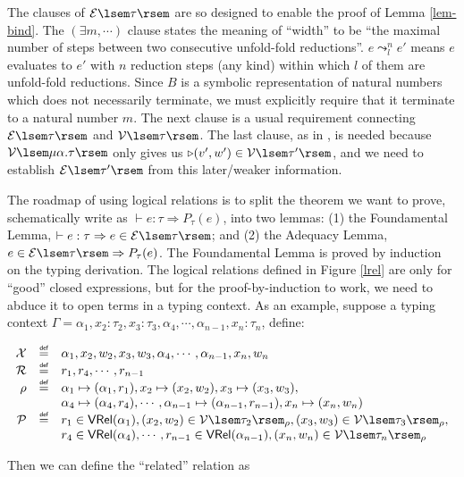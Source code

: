 \documentclass[preprint]{sigplanconf}
\newcommand{\relV}[1]{\mathcal{V}\lsem#1\rsem}
\newcommand{\relE}[1]{\mathcal{E}\lsem#1\rsem}
\newcommand{\later}{\triangleright}
\newcommand\defeq{\mathrel{\overset{\makebox[0pt]{\mbox{\normalfont\tiny\sffamily def}}}{=}}}
\begin{document}
The clauses of $\relE{\tau}$ are so designed to enable the proof of Lemma \ref{lem-bind}. The $(\exists m,\cdots)$ clause states the meaning of ``width'' to be ``the maximal number of steps between two consecutive unfold-fold reductions''. $e\leadsto^n_l e'$ means $e$ evaluates to $e'$ with $n$ reduction steps (any kind) within which $l$ of them are unfold-fold reductions. Since $B$ is a symbolic representation of natural numbers which does not necessarily terminate, we must explicitly require that it terminate to a natural number $m$. The next clause is a usual requirement connecting $\relE{\tau}$ and $\relV{\tau}$. The last clause, as in \cite{dreyer2009logical}, is needed because $\relV{\mu\alpha.\tau}$ only gives us $\later (v',w') \in \relV{\tau'}$, and we need to establish $\relE{\tau'}$ from this later/weaker information.

The roadmap of using logical relations is to split the theorem we want to prove, schematically write as $\vdash e:\tau \Rightarrow P_\tau(e)$, into two lemmas: (1) the Foundamental Lemma, $\vdash e:\tau \Rightarrow e\in\relE{\tau}$; and (2) the Adequacy Lemma, $e\in\relE{\tau} \Rightarrow P_\tau(e)$. The Foundamental Lemma is proved by induction on the typing derivation. The logical relations defined in Figure \ref{lrel} are only for ``good'' closed expressions, but for the proof-by-induction to work, we need to abduce it to open terms in a typing context. As an example, suppose a typing context $\Gamma=\alpha_1,x_2:\tau_2,x_3:\tau_3,\alpha_4,\cdots,\alpha_{n-1},x_n:\tau_n$, define:

$$
\begin{array}{rcl}
\mathcal{X}&\defeq&\alpha_1,x_2,w_2,x_3,w_3,\alpha_4,\cdots,\alpha_{n-1},x_n,w_n \\
\mathcal{R}&\defeq&r_1,r_4,\cdots,r_{n-1} \\
\rho&\defeq&\alpha_1\mapsto(\alpha_1,r_1),x_2\mapsto(x_2,w_2),x_3\mapsto(x_3,w_3),\\
& & \alpha_4\mapsto(\alpha_4,r_4),\cdots,\alpha_{n-1}\mapsto(\alpha_{n-1},r_{n-1}),x_n\mapsto(x_n,w_n) \\
\mathcal{P}&\defeq&r_1\in\mathsf{VRel}(\alpha_1),(x_2,w_2)\in\relV{\tau_2}_\rho,(x_3,w_3)\in\relV{\tau_3}_\rho,\\
& & r_4\in\mathsf{VRel}(\alpha_4),\cdots,r_{n-1}\in\mathsf{VRel}(\alpha_{n-1}),(x_n,w_n)\in\relV{\tau_n}_\rho
\end{array}
$$

Then we can define the ``related'' relation as
\end{document}
